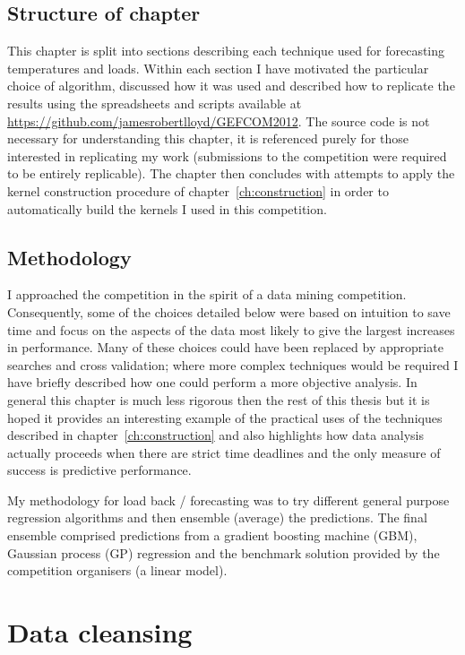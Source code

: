 \subsection{Structure of chapter}

This chapter is split into sections describing each technique used for forecasting temperatures and loads.
Within each section I have motivated the particular choice of algorithm, discussed how it was used and described how to replicate the results using the spreadsheets and scripts available at \url{https://github.com/jamesrobertlloyd/GEFCOM2012}.
The source code is not necessary for understanding this chapter, it is referenced purely for those interested in replicating my work (submissions to the competition were required to be entirely replicable).
The chapter then concludes with attempts to apply the kernel construction procedure of chapter~\ref{ch:construction} in order to automatically build the kernels I used in this competition.

\subsection{Methodology}

I approached the competition in the spirit of a data mining competition.
Consequently, some of the choices detailed below were based on intuition to save time and focus on the aspects of the data most likely to give the largest increases in performance.
Many of these choices could have been replaced by appropriate searches and cross validation; where more complex techniques would be required I have briefly described how one could perform a more objective analysis.
In general this chapter is much less rigorous then the rest of this thesis but it is hoped it provides an interesting example of the practical uses of the techniques described in chapter~\ref{ch:construction} and also highlights how data analysis actually proceeds when there are strict time deadlines and the only measure of success is predictive performance.

My methodology for load back / forecasting was to try different general purpose regression algorithms and then ensemble (average) the predictions.
The final ensemble comprised predictions from a gradient boosting machine (GBM), Gaussian process (GP) regression and the benchmark solution provided by the competition organisers (a linear model).

\section{Data cleansing}


